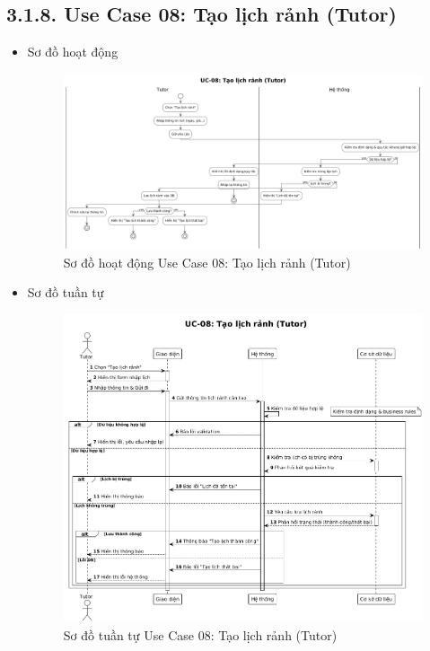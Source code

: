 \subsection*{3.1.8. Use Case 08: Tạo lịch rảnh (Tutor)}
\begin{itemize}
    \item Sơ đồ hoạt động
    \begin{figure}[H]
    \centering
    \includegraphics[scale=0.3 ]{Picture/ACUC08.png}
    \caption{Sơ đồ hoạt động Use Case 08: Tạo lịch rảnh (Tutor)}
    \end{figure}
    \item Sơ đồ tuần tự
    \begin{figure}[H]
    \centering
    \includegraphics[scale=0.35 ]{Picture/SEUC08.png}
    \caption{Sơ đồ tuần tự Use Case 08: Tạo lịch rảnh (Tutor)}
    \end{figure}
\end{itemize}

